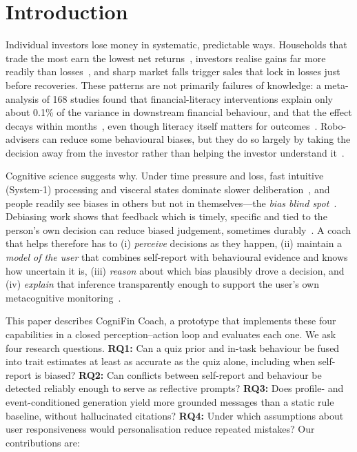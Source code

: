 \documentclass[conference]{IEEEtran}
\begin{document}
\section{Introduction}
Individual investors lose money in systematic, predictable ways. Households that trade the most earn the lowest net returns~\cite{bo00}, investors realise gains far more readily than losses~\cite{ss85,odean98}, and sharp market falls trigger sales that lock in losses just before recoveries. These patterns are not primarily failures of knowledge: a meta-analysis of 168 studies found that financial-literacy interventions explain only about 0.1\% of the variance in downstream financial behaviour, and that the effect decays within months~\cite{flm14}, even though literacy itself matters for outcomes~\cite{lm14}. Robo-advisers can reduce some behavioural biases, but they do so largely by taking the decision away from the investor rather than helping the investor understand it~\cite{dpr19}.

Cognitive science suggests why. Under time pressure and loss, fast intuitive (System-1) processing and visceral states dominate slower deliberation~\cite{kahneman11,es13,loewenstein96}, and people readily see biases in others but not in themselves---the \textit{bias blind spot}~\cite{pronin02}. Debiasing work shows that feedback which is timely, specific and tied to the person's own decision can reduce biased judgement, sometimes durably~\cite{fischhoff82,larrick04,morewedge15}. A coach that helps therefore has to (i) \textit{perceive} decisions as they happen, (ii) maintain a \textit{model of the user} that combines self-report with behavioural evidence and knows how uncertain it is, (iii) \textit{reason} about which bias plausibly drove a decision, and (iv) \textit{explain} that inference transparently enough to support the user's own metacognitive monitoring~\cite{flavell79}.

This paper describes CogniFin Coach, a prototype that implements these four capabilities in a closed perception--action loop and evaluates each one. We ask four research questions. \textbf{RQ1:} Can a quiz prior and in-task behaviour be fused into trait estimates at least as accurate as the quiz alone, including when self-report is biased? \textbf{RQ2:} Can conflicts between self-report and behaviour be detected reliably enough to serve as reflective prompts? \textbf{RQ3:} Does profile- and event-conditioned generation yield more grounded messages than a static rule baseline, without hallucinated citations? \textbf{RQ4:} Under which assumptions about user responsiveness would personalisation reduce repeated mistakes? Our contributions are:
\end{document}
